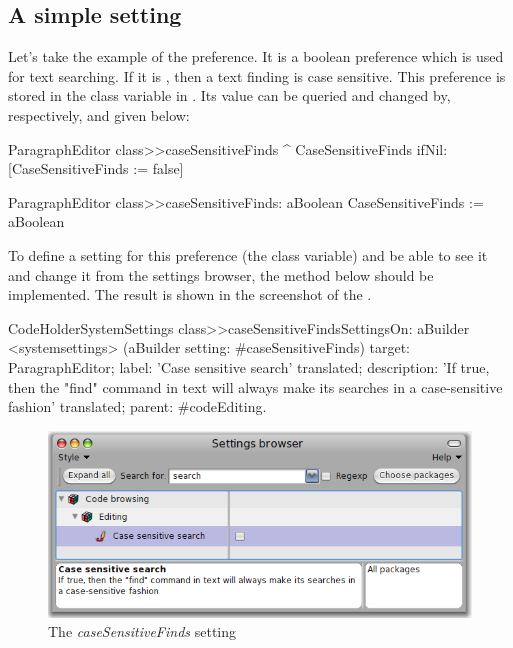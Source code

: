 \documentclass[a4paper,10pt,twoside]{book}
\begin{document}
\subsection{A simple setting}
Let's take the example of the  preference. It is a boolean preference which is used for text searching. If it is , then a text finding is case sensitive. This preference is stored in the  class variable in . Its value can be queried and changed by, respectively,  and  given below:
\begin{code}{}
ParagraphEditor class>>caseSensitiveFinds
	^ CaseSensitiveFinds ifNil: [CaseSensitiveFinds := false]

ParagraphEditor class>>caseSensitiveFinds: aBoolean
	CaseSensitiveFinds := aBoolean
\end{code}

To define a setting for this preference (the  class variable) and be able to see it and change it from the settings browser, the method below should be implemented. The result is shown in the screenshot of the . 

\begin{code}{}
CodeHolderSystemSettings class>>caseSensitiveFindsSettingsOn: aBuilder
	<systemsettings>
	(aBuilder setting: #caseSensitiveFinds) 
		target: ParagraphEditor;
		label: 'Case sensitive search' translated;
		description: 'If true, then the "find" command in text will always make its searches in a case-sensitive fashion' translated;
		parent: #codeEditing.
\end{code}

\begin{figure}[tbh]
\begin{center}
\includegraphics[scale=0.4]{caseSensitiveFinds_setting_declaration1}
\caption{The \textit{caseSensitiveFinds} setting}
\end{center}
\end{figure}
\end{document}
